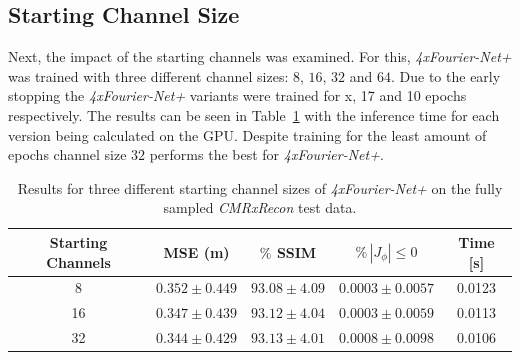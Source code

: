 \documentclass[english,version-2022-01]{uzl-thesis} %
\begin{document}
\subsection{Starting Channel Size} \label{SubSec:ResultsStartingChannelsCMRxRecon}
Next, the impact of the starting channels was examined. For this, \emph{4xFourier-Net+} was trained with three different channel sizes: $8$, $16$, $32$ and $64$. 
Due to the early stopping the \emph{4xFourier-Net+} variants were trained for x, 17 and 10 epochs respectively. The results can be seen in Table~\ref{tab:StartingChannelsFourierNet+CMRxRecon} with the inference time for each version being calculated on the GPU.
Despite training for the least amount of epochs channel size $32$ performs the best for \emph{4xFourier-Net+}.

\begin{table}[htpb]
	\centering
	\caption{Results for three different starting channel sizes of  \emph{4xFourier-Net+} on the fully sampled \emph{CMRxRecon} test data.}
	\label{tab:StartingChannelsFourierNet+CMRxRecon}
	\begin{tabular}{c c c c c} %
		\toprule
		Starting Channels & MSE (m) & $\%$ SSIM & $\% \, |J_{\phi}|\leq0$ & Time [s]\\
		\midrule
		8 & $0.352 \pm 0.449$ & $93.08 \pm 4.09$ & $0.0003 \pm 0.0057$ & 0.0123\\ 
		16 & $0.347 \pm 0.439$ & $93.12 \pm 4.04$ & $0.0003 \pm 0.0059$ & 0.0113\\  
		32 & $0.344 \pm 0.429$ & $93.13 \pm 4.01$ & $0.0008 \pm 0.0098$ & 0.0106\\  
		\bottomrule
	\end{tabular}
\end{table}
\end{document}
